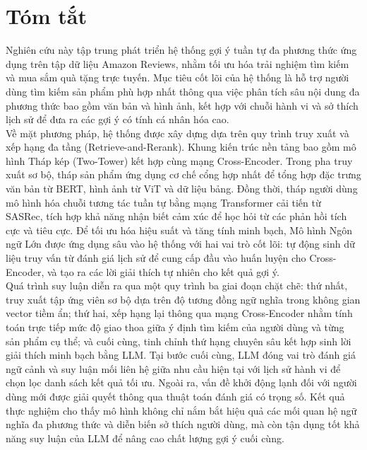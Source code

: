 \section*{Tóm tắt}
\thispagestyle{empty}

Nghiên cứu này tập trung phát triển hệ thống gợi ý tuần tự đa phương thức ứng dụng trên tập dữ liệu Amazon Reviews, nhằm tối ưu hóa trải nghiệm tìm kiếm và mua sắm quà tặng trực tuyến. Mục tiêu cốt lõi của hệ thống là hỗ trợ người dùng tìm kiếm sản phẩm phù hợp nhất thông qua việc phân tích sâu nội dung đa phương thức bao gồm văn bản và hình ảnh, kết hợp với chuỗi hành vi và sở thích lịch sử để đưa ra các gợi ý có tính cá nhân hóa cao.\\

Về mặt phương pháp, hệ thống được xây dựng dựa trên quy trình truy xuất và xếp hạng đa tầng (Retrieve-and-Rerank). Khung kiến trúc nền tảng bao gồm mô hình Tháp kép (Two-Tower) kết hợp cùng mạng Cross-Encoder. Trong pha truy xuất sơ bộ, tháp sản phẩm ứng dụng cơ chế cổng hợp nhất để tổng hợp đặc trưng văn bản từ BERT, hình ảnh từ ViT và dữ liệu bảng. Đồng thời, tháp người dùng mô hình hóa chuỗi tương tác tuần tự bằng mạng Transformer cải tiến từ SASRec, tích hợp khả năng nhận biết cảm xúc để học hỏi từ các phản hồi tích cực và tiêu cực. Để tối ưu hóa hiệu suất và tăng tính minh bạch, Mô hình Ngôn ngữ Lớn được ứng dụng sâu vào hệ thống với hai vai trò cốt lõi: tự động sinh dữ liệu truy vấn từ đánh giá lịch sử để cung cấp đầu vào huấn luyện cho Cross-Encoder, và tạo ra các lời giải thích tự nhiên cho kết quả gợi ý.\\

Quá trình suy luận diễn ra qua một quy trình ba giai đoạn chặt chẽ: thứ nhất, truy xuất tập ứng viên sơ bộ dựa trên độ tương đồng ngữ nghĩa trong không gian vector tiềm ẩn; thứ hai, xếp hạng lại thông qua mạng Cross-Encoder nhằm tính toán trực tiếp mức độ giao thoa giữa ý định tìm kiếm của người dùng và từng sản phẩm cụ thể; và cuối cùng, tinh chỉnh thứ hạng chuyên sâu kết hợp sinh lời giải thích minh bạch bằng LLM. Tại bước cuối cùng, LLM đóng vai trò đánh giá ngữ cảnh và suy luận mối liên hệ giữa nhu cầu hiện tại với lịch sử hành vi để chọn lọc danh sách kết quả tối ưu. Ngoài ra, vấn đề khởi động lạnh đối với người dùng mới được giải quyết thông qua thuật toán đánh giá có trọng số. Kết quả thực nghiệm cho thấy mô hình không chỉ nắm bắt hiệu quả các mối quan hệ ngữ nghĩa đa phương thức và diễn biến sở thích người dùng, mà còn tận dụng tốt khả năng suy luận của LLM để nâng cao chất lượng gợi ý cuối cùng.\\
\clearpage
{}

